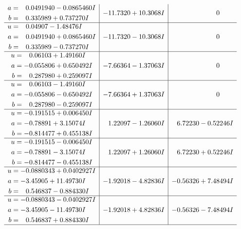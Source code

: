 \documentclass[1p]{elsarticle_modified}
\theoremstyle{definition}
\begin{document}
$$\begin{array}{c|c|c}
\begin{aligned}
a &= \phantom{-}0.0491940 - 0.0865460 I \\
b &= \phantom{-}0.335989 + 0.737270 I\end{aligned}
 & -11.7320 + 10.3068 I & \phantom{-0.000000 } 0 \\ \hline\begin{aligned}
u &= \phantom{-}0.04907 - 1.48476 I \\
a &= \phantom{-}0.0491940 + 0.0865460 I \\
b &= \phantom{-}0.335989 - 0.737270 I\end{aligned}
 & -11.7320 - 10.3068 I & \phantom{-0.000000 } 0 \\ \hline\begin{aligned}
u &= \phantom{-}0.06103 + 1.49160 I \\
a &= -0.055806 + 0.650492 I \\
b &= \phantom{-}0.287980 + 0.259097 I\end{aligned}
 & -7.66364 - 1.37063 I & \phantom{-0.000000 } 0 \\ \hline\begin{aligned}
u &= \phantom{-}0.06103 - 1.49160 I \\
a &= -0.055806 - 0.650492 I \\
b &= \phantom{-}0.287980 - 0.259097 I\end{aligned}
 & -7.66364 + 1.37063 I & \phantom{-0.000000 } 0 \\ \hline\begin{aligned}
u &= -0.191515 + 0.006450 I \\
a &= -0.78891 + 3.15074 I \\
b &= -0.814477 + 0.455138 I\end{aligned}
 & \phantom{-}1.22097 - 1.26060 I & \phantom{-}6.72230 - 0.52246 I \\ \hline\begin{aligned}
u &= -0.191515 - 0.006450 I \\
a &= -0.78891 - 3.15074 I \\
b &= -0.814477 - 0.455138 I\end{aligned}
 & \phantom{-}1.22097 + 1.26060 I & \phantom{-}6.72230 + 0.52246 I \\ \hline\begin{aligned}
u &= -0.0880343 + 0.0402927 I \\
a &= -3.45905 + 11.49730 I \\
b &= \phantom{-}0.546837 - 0.884330 I\end{aligned}
 & -1.92018 - 4.82836 I & -0.56326 + 7.48494 I \\ \hline\begin{aligned}
u &= -0.0880343 - 0.0402927 I \\
a &= -3.45905 - 11.49730 I \\
b &= \phantom{-}0.546837 + 0.884330 I\end{aligned}
 & -1.92018 + 4.82836 I & -0.56326 - 7.48494 I\\
 \hline 
 \end{array}$$\newpage\newpage\renewcommand{\arraystretch}{1}
\end{document}
